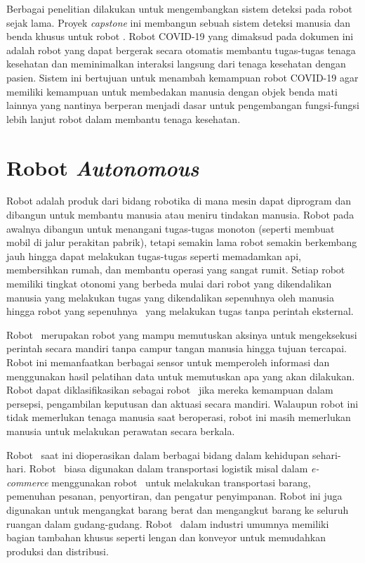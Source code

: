 
Berbagai penelitian dilakukan untuk mengembangkan sistem deteksi pada robot sejak lama. Proyek \textit{capstone} ini membangun sebuah sistem deteksi manusia dan benda khusus  untuk robot \covid. Robot COVID-19 yang dimaksud pada dokumen ini adalah robot yang dapat bergerak secara otomatis membantu tugas-tugas tenaga kesehatan dan meminimalkan interaksi langsung dari tenaga kesehatan dengan pasien. Sistem ini bertujuan untuk menambah kemampuan robot COVID-19 agar memiliki kemampuan untuk membedakan manusia dengan objek benda mati lainnya yang nantinya berperan menjadi dasar untuk pengembangan fungsi-fungsi lebih lanjut robot dalam membantu tenaga kesehatan.


\section{Robot \textit{Autonomous}}
\label{sec:Robot_Autonomous}

    Robot adalah produk dari bidang robotika di mana mesin dapat diprogram dan dibangun untuk membantu manusia atau meniru tindakan manusia. Robot pada awalnya dibangun untuk menangani tugas-tugas monoton (seperti membuat mobil di jalur perakitan pabrik), tetapi semakin lama robot semakin berkembang jauh hingga dapat melakukan tugas-tugas seperti memadamkan api, membersihkan rumah, dan membantu operasi yang sangat rumit. Setiap robot memiliki tingkat otonomi yang berbeda mulai dari robot yang dikendalikan manusia yang melakukan tugas yang dikendalikan sepenuhnya oleh manusia hingga robot yang sepenuhnya \auto\ yang melakukan tugas tanpa perintah eksternal.
    
    Robot \auto\ merupakan robot yang mampu memutuskan aksinya untuk mengeksekusi perintah secara mandiri tanpa campur tangan manusia hingga tujuan tercapai\cite{b1}. Robot ini memanfaatkan berbagai sensor untuk memperoleh informasi dan menggunakan hasil pelatihan data untuk memutuskan apa yang akan dilakukan. Robot dapat diklasifikasikan sebagai robot \auto\ jika mereka kemampuan dalam persepsi, pengambilan keputusan dan aktuasi secara mandiri. Walaupun robot ini tidak memerlukan tenaga manusia saat beroperasi, robot ini masih memerlukan manusia untuk melakukan perawatan secara berkala.

    Robot \auto\ saat ini dioperasikan dalam berbagai bidang dalam kehidupan sehari-hari. 
    Robot \auto\ biasa digunakan dalam transportasi logistik misal dalam \textit{e-commerce} menggunakan robot \auto\ untuk melakukan transportasi barang, pemenuhan pesanan, penyortiran, dan pengatur penyimpanan. Robot ini juga digunakan untuk mengangkat barang berat dan mengangkut barang ke seluruh ruangan dalam gudang-gudang. 
    Robot \auto\ dalam industri umumnya memiliki bagian tambahan khusus seperti lengan dan konveyor untuk memudahkan produksi dan distribusi.
    
